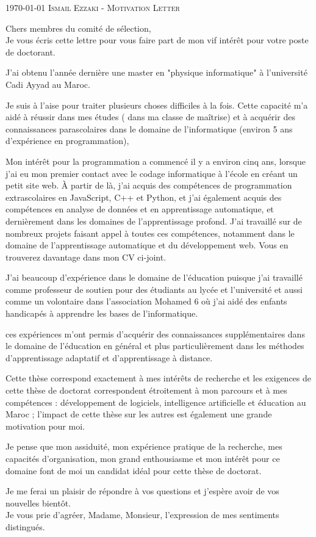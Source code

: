 \documentclass[localFont,12pt,compact]{yaac-another-awesome-cv}
\begin{document}
	\makecvheader

	\makecvfooter
		{\textsc{\today}} %
		{\textsc{Ismail Ezzaki - Motivation Letter}}
		{\thepage}

Chers membres du comité de sélection,\\
Je vous écris cette lettre pour vous faire part de mon vif intérêt pour votre poste de doctorant.		
		
%		
% 
% 
% 

J'ai obtenu l'année dernière une master en "physique informatique" à l'université Cadi Ayyad au Maroc.

Je suis à l'aise pour traiter plusieurs choses difficiles à la fois. Cette capacité m'a aidé à réussir dans mes études (  dans ma classe de maîtrise) et à acquérir des connaissances parascolaires dans le domaine de l'informatique (environ 5 ans d'expérience en programmation),


Mon intérêt pour la programmation a commencé il y a environ cinq ans, lorsque j'ai eu mon premier contact avec le codage informatique à l'école en créant un petit site web. À partir de là, j'ai acquis des compétences de programmation extrascolaires en JavaScript, C++ et Python, et j'ai également acquis des compétences en analyse de données et en apprentissage automatique, et dernièrement dans les domaines de l'apprentissage profond. J'ai travaillé sur de nombreux projets faisant appel à toutes ces compétences, notamment dans le domaine de l'apprentissage automatique et du développement web. Vous en trouverez davantage dans mon CV ci-joint.

J'ai beaucoup d'expérience dans le domaine de l'éducation puisque j'ai travaillé comme professeur de soutien pour des étudiants au lycée et l'université et aussi comme un volontaire dans l'association Mohamed 6 où j'ai aidé des enfants handicapés à apprendre les bases de l'informatique.

ces expériences m'ont permis d'acquérir des connaissances supplémentaires dans le domaine de l'éducation en général et plus particulièrement dans les méthodes d'apprentissage adaptatif et d'apprentissage à distance.

Cette thèse correspond exactement à mes intérêts de recherche et les exigences de cette thèse de doctorat correspondent étroitement à mon parcours et à mes compétences : développement de logiciels, intelligence artificielle et éducation au Maroc ; l'impact de cette thèse sur les autres est également une grande motivation pour moi.

Je pense que mon assiduité, mon expérience pratique de la recherche, mes capacités d'organisation, mon grand enthousiasme et mon intérêt pour ce domaine font de moi un candidat idéal pour cette thèse de doctorat.


\vspace{1ex}
Je me ferai un plaisir de répondre à vos questions et j'espère avoir de vos nouvelles bientôt.\\
Je vous prie d'agréer, Madame, Monsieur, l'expression de mes sentiments distingués.
\end{document}

